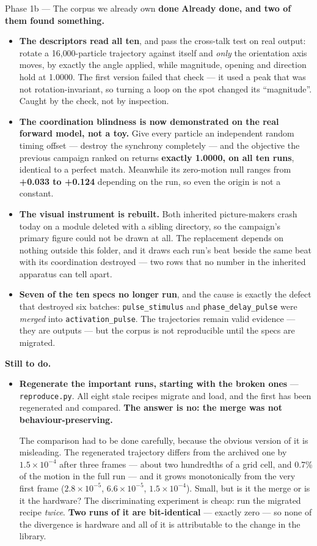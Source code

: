 \documentclass[11pt,a4paper]{article}
\newcommand{\code}[1]{\texttt{#1}}
\newcommand{\dn}{\textcolor{good}{\textbf{done}}}
\begin{document}
\begin{phasebox}{Phase 1b --- The corpus we already own \hfill \dn}
\textbf{Already done, and two of them found something.}
\begin{itemize}
\item \textbf{The descriptors read all ten}, and pass the cross-talk test on real output: rotate a
16{,}000-particle trajectory against itself and \emph{only} the orientation axis moves, by exactly
the angle applied, while magnitude, opening and direction hold at 1.0000. The first version failed
that check --- it used a peak that was not rotation-invariant, so turning a loop on the spot
changed its ``magnitude''. Caught by the check, not by inspection.
\item \textbf{The coordination blindness is now demonstrated on the real forward model, not a
toy.} Give every particle an independent random timing offset --- destroy the synchrony
completely --- and the objective the previous campaign ranked on returns \textbf{exactly 1.0000, on
all ten runs}, identical to a perfect match. Meanwhile its zero-motion null ranges from
\textbf{+0.033 to +0.124} depending on the run, so even the origin is not a constant.
\item \textbf{The visual instrument is rebuilt.} Both inherited picture-makers crash today on a
module deleted with a sibling directory, so the campaign's primary figure could not be drawn at
all. The replacement depends on nothing outside this folder, and it draws each run's beat beside
the same beat with its coordination destroyed --- two rows that no number in the inherited
apparatus can tell apart.
\item \textbf{Seven of the ten specs no longer run}, and the cause is exactly the defect that
destroyed six batches: \code{pulse\_stimulus} and \code{phase\_delay\_pulse} were \emph{merged}
into \code{activation\_pulse}. The trajectories remain valid evidence --- they are outputs --- but
the corpus is not reproducible until the specs are migrated.
\end{itemize}

\textbf{Still to do.}
\begin{itemize}
\item \textbf{Regenerate the important runs, starting with the broken ones} ---
\code{reproduce.py}. All eight stale recipes migrate and load, and the first has been regenerated
and compared. \textbf{The answer is no: the merge was not behaviour-preserving.}

The comparison had to be done carefully, because the obvious version of it is misleading. The
regenerated trajectory differs from the archived one by $1.5\times10^{-4}$ after three frames ---
about two hundredths of a grid cell, and 0.7\% of the motion in the full run --- and it grows
monotonically from the very first frame ($2.8\times10^{-5}$, $6.6\times10^{-5}$,
$1.5\times10^{-4}$). Small, but is it the merge or is it the hardware? The discriminating
experiment is cheap: run the migrated recipe \emph{twice}. \textbf{Two runs of it are
bit-identical} --- exactly zero --- so none of the divergence is hardware and all of it is
attributable to the change in the library.


\end{itemize}
\end{phasebox}
\end{document}
